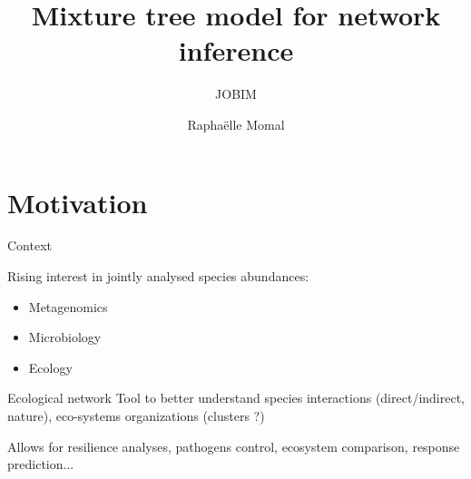 \documentclass{beamer}
\title{Mixture tree model for network inference}
\subtitle{JOBIM}
\author{Raphaëlle Momal}
\institute{UMR518 AgroParis Tech/INRA}
\newcommand{\emphase}[1]{\textcolor{Complement}{#1}}
\begin{document}
\frame{\titlepage}


\section{Motivation}

\begin{frame}{Context}

Rising interest in \emphase{jointly analysed }species abundances:
\begin{itemize}
	\item Metagenomics 
	\item Microbiology
	\item Ecology
\end{itemize}

\begin{block}{Ecological network}
Tool to better understand species interactions (direct/indirect, nature), eco-systems organizations (clusters ?) 
\end{block}\bigskip
Allows for resilience analyses, pathogens control, ecosystem comparison, response prediction...
\end{frame}
\end{document}
